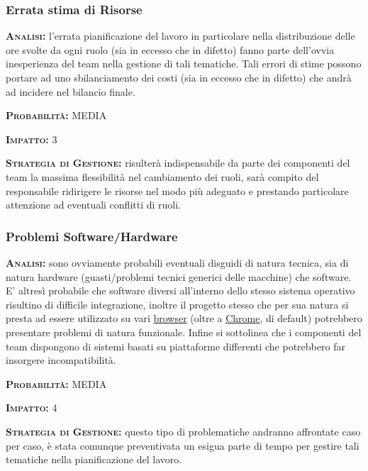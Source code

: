 \subsubsection{Errata stima di Risorse}
\begin{description}
	\item{\scshape\bfseries Analisi:} l'errata pianificazione del lavoro in particolare nella distribuzione delle ore svolte da ogni ruolo (sia in eccesso che in difetto) fanno parte dell'ovvia inesperienza del team nella gestione di tali tematiche. Tali errori di stime possono portare ad uno sbilanciamento dei costi (sia in eccesso che in difetto) che andrà ad incidere nel bilancio finale.
	\item{\scshape\bfseries Probabilità:} MEDIA
	\item{\scshape\bfseries Impatto:} 3
	\item{\scshape\bfseries Strategia di Gestione:} risulterà indispensabile da parte dei componenti del team la massima flessibilità nel cambiamento dei ruoli, sarà compito del responsabile ridirigere le risorse nel modo più adeguato e prestando particolare attenzione ad eventuali conflitti di ruoli.
\end{description}

\subsubsection{Problemi Software/Hardware}
\begin{description}
	\item{\scshape\bfseries Analisi:} sono ovviamente probabili eventuali disguidi di natura tecnica, sia di natura hardware (guasti/problemi tecnici generici delle macchine) che software. E' altresì probabile che software diversi all'interno dello stesso sistema operativo risultino di difficile integrazione, inoltre il progetto stesso che per sua natura si presta ad essere utilizzato su vari \underline{browser} (oltre a \underline{Chrome}, di default) potrebbero presentare problemi di natura funzionale. Infine si sottolinea che i componenti del team dispongono di sistemi basati su piattaforme differenti che potrebbero far insorgere incompatibilità.
	\item{\scshape\bfseries Probabilità:} MEDIA
	\item{\scshape\bfseries Impatto:} 4
	\item{\scshape\bfseries Strategia di Gestione:} questo tipo di problematiche andranno affrontate caso per caso, è stata comunque preventivata un esigua parte di tempo per gestire tali tematiche nella pianificazione del lavoro.
\end{description}




